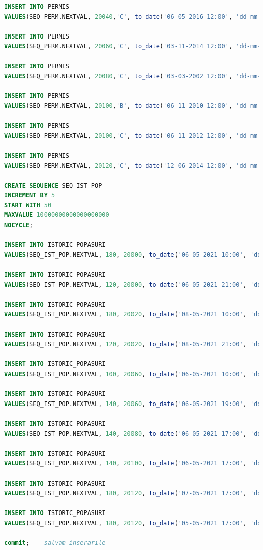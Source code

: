 \documentclass[12pt, a4paper]{article}
\begin{document}
\begin{lstlisting}[language=SQL]
INSERT INTO PERMIS
VALUES(SEQ_PERM.NEXTVAL, 20040,'C', to_date('06-05-2016 12:00', 'dd-mm-yyyy hh24:mi'));

INSERT INTO PERMIS
VALUES(SEQ_PERM.NEXTVAL, 20060,'C', to_date('03-11-2014 12:00', 'dd-mm-yyyy hh24:mi'));

INSERT INTO PERMIS
VALUES(SEQ_PERM.NEXTVAL, 20080,'C', to_date('03-03-2002 12:00', 'dd-mm-yyyy hh24:mi'));

INSERT INTO PERMIS
VALUES(SEQ_PERM.NEXTVAL, 20100,'B', to_date('06-11-2010 12:00', 'dd-mm-yyyy hh24:mi'));

INSERT INTO PERMIS
VALUES(SEQ_PERM.NEXTVAL, 20100,'C', to_date('06-11-2012 12:00', 'dd-mm-yyyy hh24:mi'));

INSERT INTO PERMIS
VALUES(SEQ_PERM.NEXTVAL, 20120,'C', to_date('12-06-2014 12:00', 'dd-mm-yyyy hh24:mi'));

CREATE SEQUENCE SEQ_IST_POP
INCREMENT BY 5
START WITH 50
MAXVALUE 10000000000000000000
NOCYCLE;

INSERT INTO ISTORIC_POPASURI
VALUES(SEQ_IST_POP.NEXTVAL, 180, 20000, to_date('06-05-2021 10:00', 'dd-mm-yyyy hh24:mi'), to_date('06-05-2021 12:00', 'dd-mm-yyyy hh24:mi'));

INSERT INTO ISTORIC_POPASURI
VALUES(SEQ_IST_POP.NEXTVAL, 120, 20000, to_date('06-05-2021 21:00', 'dd-mm-yyyy hh24:mi'), to_date('06-05-2021 21:30', 'dd-mm-yyyy hh24:mi'));

INSERT INTO ISTORIC_POPASURI
VALUES(SEQ_IST_POP.NEXTVAL, 180, 20020, to_date('08-05-2021 10:00', 'dd-mm-yyyy hh24:mi'), to_date('08-05-2021 12:00', 'dd-mm-yyyy hh24:mi'));

INSERT INTO ISTORIC_POPASURI
VALUES(SEQ_IST_POP.NEXTVAL, 120, 20020, to_date('08-05-2021 21:00', 'dd-mm-yyyy hh24:mi'), to_date('08-05-2021 21:30', 'dd-mm-yyyy hh24:mi'));

INSERT INTO ISTORIC_POPASURI
VALUES(SEQ_IST_POP.NEXTVAL, 100, 20060, to_date('06-05-2021 10:00', 'dd-mm-yyyy hh24:mi'), to_date('06-05-2021 10:20', 'dd-mm-yyyy hh24:mi'));

INSERT INTO ISTORIC_POPASURI
VALUES(SEQ_IST_POP.NEXTVAL, 140, 20060, to_date('06-05-2021 19:00', 'dd-mm-yyyy hh24:mi'), to_date('06-05-2021 19:30', 'dd-mm-yyyy hh24:mi'));

INSERT INTO ISTORIC_POPASURI
VALUES(SEQ_IST_POP.NEXTVAL, 140, 20080, to_date('06-05-2021 17:00', 'dd-mm-yyyy hh24:mi'), to_date('06-05-2021 17:30', 'dd-mm-yyyy hh24:mi'));

INSERT INTO ISTORIC_POPASURI
VALUES(SEQ_IST_POP.NEXTVAL, 140, 20100, to_date('06-05-2021 17:00', 'dd-mm-yyyy hh24:mi'), to_date('06-05-2021 17:30', 'dd-mm-yyyy hh24:mi'));

INSERT INTO ISTORIC_POPASURI
VALUES(SEQ_IST_POP.NEXTVAL, 180, 20120, to_date('07-05-2021 17:00', 'dd-mm-yyyy hh24:mi'), to_date('07-05-2021 17:30', 'dd-mm-yyyy hh24:mi'));

INSERT INTO ISTORIC_POPASURI
VALUES(SEQ_IST_POP.NEXTVAL, 180, 20120, to_date('05-05-2021 17:00', 'dd-mm-yyyy hh24:mi'), to_date('05-05-2021 17:30', 'dd-mm-yyyy hh24:mi'));

commit; -- salvam inserarile
\end{lstlisting}
\end{document}
